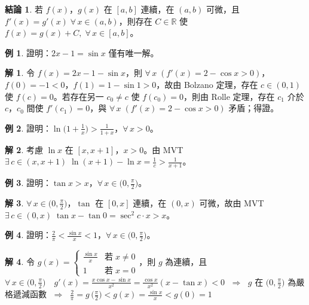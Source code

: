\documentclass[12pt]{extarticle}
\newcommand{\ds}{\displaystyle}
\newcommand{\ie}{\;\Longrightarrow\;}
\theoremstyle{definition}
\newtheorem*{fact}{結論}
\newtheorem*{ex}{例}
\newtheorem*{sol}{解}
\newcommand{\myline}{\noindent\makebox[\linewidth]{\rule{\paperwidth}{0.4pt}}}
\begin{document}
\begin{fact}
  若 $f(x)$，$g(x)$ 在 $[a, b]$ 連續，在 $(a, b)$ 可微，且 $f'(x) = g'(x)\;\forall\,x\in(a, b)$，則存在 $C\in\mathbb{R}$ 使 $f(x) = g(x) + C,\;\forall\,x\in[a, b]$。
\end{fact}

\begin{ex}
  證明：$\ds 2x - 1 = \sin x$ 僅有唯一解。
\end{ex}

\begin{sol}
  令 $\ds f(x) = 2 x - 1 - \sin x$，則 $\ds\forall\,x\;(f'(x) = 2 - \cos x > 0)$，$f(0) = -1 < 0$，$f(1) = 1 - \sin 1 > 0$，故由 Bolzano 定理，存在 $\ds c\in(0, 1)$ 使 $f(c) = 0$。若存在另一 $c_0\ne c$ 使 $f(c_0) = 0$，則由 Rolle 定理，存在 $c_1$ 介於 $c$，$c_0$ 間使 $f'(c_1) = 0$，與 $\ds\forall\,x\;(f'(x) = 2 - \cos x > 0)$ 矛盾；得證。
\end{sol}

\begin{ex}
  證明：$\ds\ln\big(1 + \frac{1}{x}\big) > \frac{1}{1 + x}$，$\forall\,x > 0$。
\end{ex}

\begin{sol}
  考慮 $\ds\ln x$ 在 $\ds[x, x + 1]$，$\ds x > 0$。由 MVT $\ds\exists\,c\in(x, x + 1)\;\ln(x + 1) - \ln x = \frac{1}{c} > \frac{1}{x + 1}$。
\end{sol}

\myline

\begin{ex}
  證明：$\ds\tan x > x$，$\ds\forall\,x\in\big(0, \frac{\pi}{2}\big)$。
\end{ex}

\begin{sol}
  $\ds\forall\,x\in\big(0, \frac{\pi}{2}\big)$，$\ds\tan$ 在 $[0, x]$ 連續，在 $(0, x)$ 可微，故由 MVT $\ds\exists\,c\in(0, x)\;\tan x - \tan 0 = \sec^2 c\cdot x > x$。
\end{sol}

\begin{ex}
  證明：$\ds\frac{2}{\pi} < \frac{\sin x}{x} < 1$，$\ds\forall\,x\in\big(0, \frac{\pi}{2}\big)$。
\end{ex}

\begin{sol}
  令 $\ds g(x) = \begin{cases}\frac{\sin x}{x} & \text{若}\;x\ne 0 \\ 1 & \text{若}\;x = 0 \end{cases}$，則 $g$ 為連續，且 $\ds\forall\,x\in\big(0,\frac{\pi}{2}\big)\quad g'(x) = \frac{x\cos x - \sin x}{x^2} = \frac{\cos x}{x^2}(x - \tan x) < 0$ $\ie$ $g$ 在 $\ds\big(0,\frac{\pi}{2}\big)$ 為嚴格遞減函數 $\ie$ $\ds\frac{2}{\pi} = g\,\big(\frac{\pi}{2}\big) < g(x) = \frac{\sin x}{x} < g(0) = 1$     
\end{sol}
\end{document}
